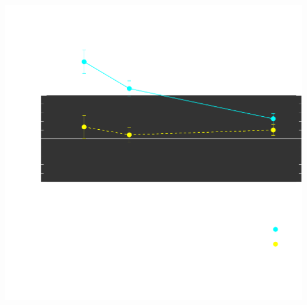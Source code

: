 \documentclass{beamer}
\begin{document}
{\begin{columns}
\begin{column}{0.5\textwidth}
\begin{center}
                \includegraphics[width=\textwidth]{c-select-bias-range-inv.pdf}
                \newline
            \end{center}
        \end{column}
    \end{columns}


}
\end{document}
